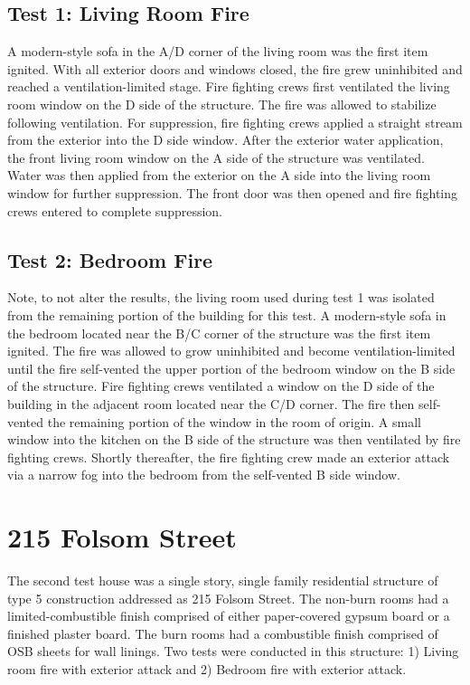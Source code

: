 \documentclass[12pt,oneside]{book}
\begin{document}
\subsection{Test 1: Living Room Fire}

A modern-style sofa in the A/D corner of the living room was the first item ignited. With all exterior doors and windows closed, the fire grew uninhibited and reached a ventilation-limited stage. Fire fighting crews first ventilated the living room window on the D side of the structure. The fire was allowed to stabilize following ventilation. For suppression, fire fighting crews applied a straight stream from the exterior into the D side window. After the exterior water application, the front living room window on the A side of the structure was ventilated. Water was then applied from the exterior on the A side into the living room window for further suppression. The front door was then opened and fire fighting crews entered to complete suppression.

\subsection{Test 2: Bedroom Fire}

Note, to not alter the results, the living room used during test 1 was isolated from the remaining portion of the building for this test. A modern-style sofa in the bedroom located near the B/C corner of the structure was the first item ignited. The fire was allowed to grow uninhibited and become ventilation-limited until the fire self-vented the upper portion of the bedroom window on the B side of the structure. Fire fighting crews ventilated a window on the D side of the building in the adjacent room located near the C/D corner. The fire then self-vented the remaining portion of the window in the room of origin. A small window into the kitchen on the B side of the structure was then ventilated by fire fighting crews. Shortly thereafter, the fire fighting crew made an exterior attack via a narrow fog into the bedroom from the self-vented B side window.

\section{215 Folsom Street}

The second test house was a single story, single family residential structure of type 5 construction addressed as 215 Folsom Street. The non-burn rooms had a limited-combustible finish comprised of either paper-covered gypsum board or a finished plaster board. The burn rooms had a combustible finish comprised of OSB sheets for wall linings. Two tests were conducted in this structure: 1) Living room fire with exterior attack and 2) Bedroom fire with exterior attack.
\end{document}
